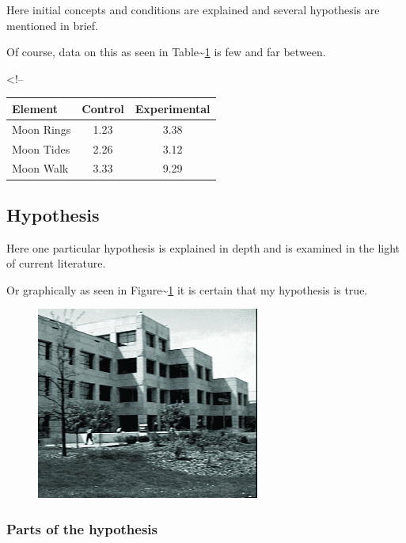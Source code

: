 \documentclass[
  12pt,
  notitlepage]{isuthesis}
\begin{document}
Here initial concepts and conditions are explained and
several hypothesis are mentioned in brief.

Of course, data on this as seen in Table\textasciitilde{}\ref{data}
is few and far between.

\begin{table}[h!tb] \centering
{}
\label{data}
<!-- %
\begin{tabular}{lcc} \hline
\textbf{Element} & \textbf{Control} & \textbf{Experimental} \\ \hline
Moon Rings & 1.23 & 3.38 \\
Moon Tides & 2.26 & 3.12 \\
Moon Walk & 3.33 & 9.29 \\ \hline
\end{tabular}
\end{table}

\subsection{Hypothesis}

Here one particular hypothesis is explained in depth
and is examined in the light of current literature.

Or graphically as seen in Figure\textasciitilde{}\ref{mgraph}
it is certain that my hypothesis is true.

\begin{figure}[h!tb] \centering

\includegraphics{Images/dc5}

\label{mgraph}
\end{figure}

\subsubsection{Parts of the hypothesis}
\end{document}
